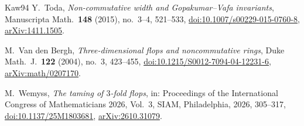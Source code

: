 \documentclass[11pt]{amsart}
\numberwithin{table}{section}
\numberwithin{figure}{section}
\numberwithin{equation}{section}
\theoremstyle{definition}
\theoremstyle{plain}
\begin{document}
\begin{thebibliography}{Kaw94}
Y.~Toda, \emph{Non-commutative width and Gopakumar--Vafa invariants}, Manuscripta Math.\ \textbf{148} (2015), no.~3--4, 521--533, \href{https://doi.org/10.1007/s00229-015-0760-8}{doi:10.1007/s00229-015-0760-8}, \href{https://arxiv.org/abs/1411.1505}{arXiv:1411.1505}.

M.~Van den Bergh, \emph{Three-dimensional flops and noncommutative rings}, Duke Math.\ J.\ \textbf{122} (2004), no.~3, 423--455, \href{https://doi.org/10.1215/S0012-7094-04-12231-6}{doi:10.1215/S0012-7094-04-12231-6}, \href{https://arxiv.org/abs/math/0207170}{arXiv:math/0207170}.

M.~Wemyss, \emph{The taming of $3$-fold flops}, in: Proceedings of the International Congress of Mathematicians 2026, Vol.~3, SIAM, Philadelphia, 2026, 305--317, \href{https://doi.org/10.1137/25M1803681}{doi:10.1137/25M1803681}, \href{https://arxiv.org/abs/2610.31079}{arXiv:2610.31079}.

\end{thebibliography}
\end{document}
